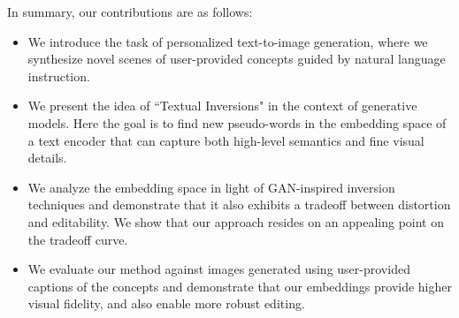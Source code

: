 In summary, our contributions are as follows:
\begin{itemize}
    \item We introduce the task of personalized text-to-image generation, where we synthesize novel scenes of user-provided concepts guided by natural language instruction.
    \item We present the idea of ``Textual Inversions" in the context of generative models. Here the goal is to find new pseudo-words in the embedding space of a text encoder that can capture both high-level semantics and fine visual details. 
    \item We analyze the embedding space in light of GAN-inspired inversion techniques and demonstrate that it also exhibits a tradeoff between distortion and editability. We show that our approach resides on an appealing point on the tradeoff curve.
    \item We evaluate our method against images generated using user-provided captions of the concepts and demonstrate that our embeddings provide higher visual fidelity, and also enable more robust editing.
\end{itemize}




